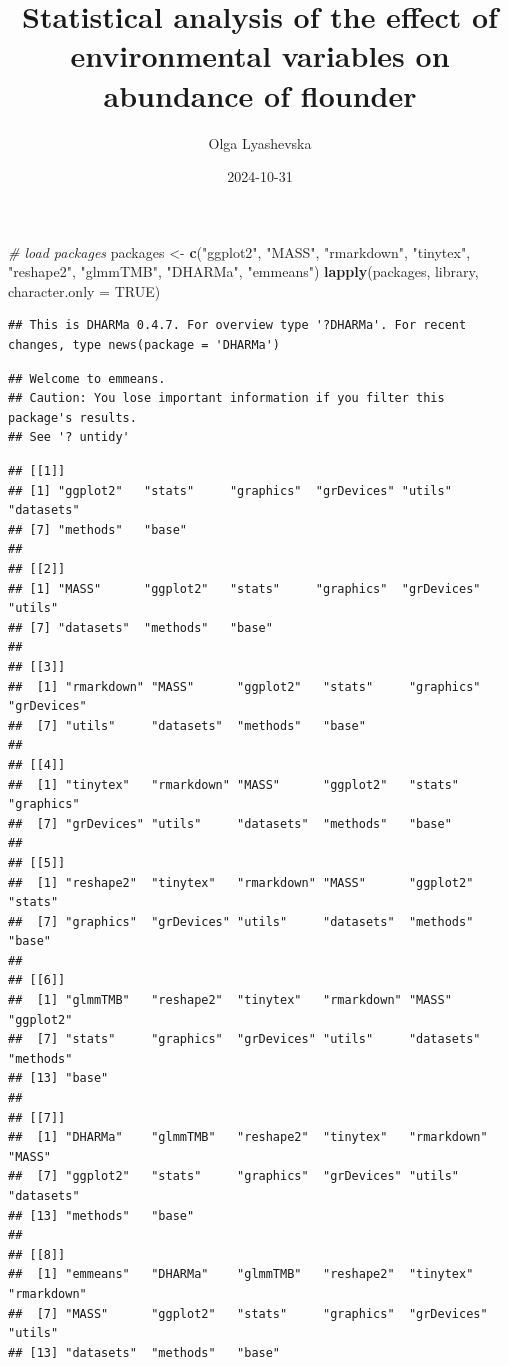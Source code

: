 \documentclass[
]{article}
\title{Statistical analysis of the effect of environmental variables on
abundance of flounder}
\author{Olga Lyashevska}
\date{2024-10-31}
\newenvironment{Shaded}{\begin{snugshade}}{\end{snugshade}}
\newcommand{\AttributeTok}[1]{\textcolor[rgb]{0.13,0.29,0.53}{#1}}
\newcommand{\CommentTok}[1]{\textcolor[rgb]{0.56,0.35,0.01}{\textit{#1}}}
\newcommand{\ConstantTok}[1]{\textcolor[rgb]{0.56,0.35,0.01}{#1}}
\newcommand{\FunctionTok}[1]{\textcolor[rgb]{0.13,0.29,0.53}{\textbf{#1}}}
\newcommand{\NormalTok}[1]{#1}
\newcommand{\OtherTok}[1]{\textcolor[rgb]{0.56,0.35,0.01}{#1}}
\newcommand{\StringTok}[1]{\textcolor[rgb]{0.31,0.60,0.02}{#1}}
\begin{document}
\maketitle

{
\setcounter{tocdepth}{2}
\tableofcontents
}
\begin{Shaded}
\begin{Highlighting}[]
\CommentTok{\# load packages }
\NormalTok{packages }\OtherTok{\textless{}{-}} \FunctionTok{c}\NormalTok{(}\StringTok{"ggplot2"}\NormalTok{, }\StringTok{"MASS"}\NormalTok{, }\StringTok{"rmarkdown"}\NormalTok{, }\StringTok{"tinytex"}\NormalTok{, }\StringTok{"reshape2"}\NormalTok{, }\StringTok{"glmmTMB"}\NormalTok{, }\StringTok{"DHARMa"}\NormalTok{, }\StringTok{"emmeans"}\NormalTok{)}
\FunctionTok{lapply}\NormalTok{(packages, library, }\AttributeTok{character.only =} \ConstantTok{TRUE}\NormalTok{)}
\end{Highlighting}
\end{Shaded}

\begin{verbatim}
## This is DHARMa 0.4.7. For overview type '?DHARMa'. For recent changes, type news(package = 'DHARMa')
\end{verbatim}

\begin{verbatim}
## Welcome to emmeans.
## Caution: You lose important information if you filter this package's results.
## See '? untidy'
\end{verbatim}

\begin{verbatim}
## [[1]]
## [1] "ggplot2"   "stats"     "graphics"  "grDevices" "utils"     "datasets" 
## [7] "methods"   "base"     
## 
## [[2]]
## [1] "MASS"      "ggplot2"   "stats"     "graphics"  "grDevices" "utils"    
## [7] "datasets"  "methods"   "base"     
## 
## [[3]]
##  [1] "rmarkdown" "MASS"      "ggplot2"   "stats"     "graphics"  "grDevices"
##  [7] "utils"     "datasets"  "methods"   "base"     
## 
## [[4]]
##  [1] "tinytex"   "rmarkdown" "MASS"      "ggplot2"   "stats"     "graphics" 
##  [7] "grDevices" "utils"     "datasets"  "methods"   "base"     
## 
## [[5]]
##  [1] "reshape2"  "tinytex"   "rmarkdown" "MASS"      "ggplot2"   "stats"    
##  [7] "graphics"  "grDevices" "utils"     "datasets"  "methods"   "base"     
## 
## [[6]]
##  [1] "glmmTMB"   "reshape2"  "tinytex"   "rmarkdown" "MASS"      "ggplot2"  
##  [7] "stats"     "graphics"  "grDevices" "utils"     "datasets"  "methods"  
## [13] "base"     
## 
## [[7]]
##  [1] "DHARMa"    "glmmTMB"   "reshape2"  "tinytex"   "rmarkdown" "MASS"     
##  [7] "ggplot2"   "stats"     "graphics"  "grDevices" "utils"     "datasets" 
## [13] "methods"   "base"     
## 
## [[8]]
##  [1] "emmeans"   "DHARMa"    "glmmTMB"   "reshape2"  "tinytex"   "rmarkdown"
##  [7] "MASS"      "ggplot2"   "stats"     "graphics"  "grDevices" "utils"    
## [13] "datasets"  "methods"   "base"
\end{verbatim}
\end{document}
